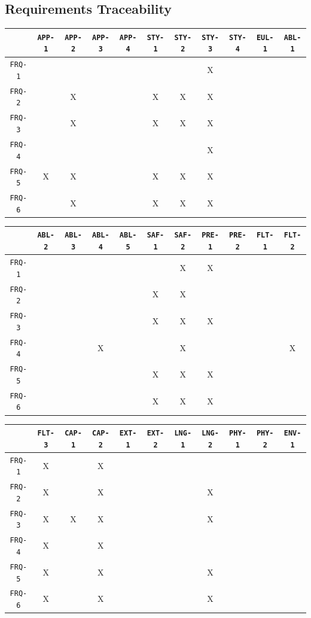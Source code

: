 \documentclass[12pt]{article}
\begin{document}
\begin{enumerate}
\section{Requirements Traceability}


\centering
\begin{tabular}{|c|c|c|c|c|c|c|c|c|c|c|}
\hline
	& \texttt{APP-1} & \texttt{APP-2} & \texttt{APP-3} & \texttt{APP-4} & \texttt{STY-1} & \texttt{STY-2} & \texttt{STY-3} & \texttt{STY-4} & \texttt{EUL-1} & \texttt{ABL-1} \\
\hline
\texttt{FRQ-1} &  &  &  &  &  &  & X &  &  &  \\ \hline
\texttt{FRQ-2} &  & X &  &  & X & X & X &  &  &  \\ \hline
\texttt{FRQ-3} &  & X &  &  & X & X & X &  &  &  \\ \hline
\texttt{FRQ-4} &  &  &  &  &  &  & X &  &  &  \\ \hline
\texttt{FRQ-5} & X & X &  &  & X & X & X &  &  &  \\ \hline
\texttt{FRQ-6} &  & X &  &  & X & X & X &  &  &  \\ \hline
\end{tabular}

\begin{tabular}{|c|c|c|c|c|c|c|c|c|c|c|}
\hline
	& \texttt{ABL-2} & \texttt{ABL-3} & \texttt{ABL-4} & \texttt{ABL-5} & \texttt{SAF-1} & \texttt{SAF-2} & \texttt{PRE-1} & \texttt{PRE-2} & \texttt{FLT-1} & \texttt{FLT-2} \\
\hline
\texttt{FRQ-1} &  &  &  &  &  & X & X &  &  &  \\ \hline
\texttt{FRQ-2} &  &  &  &  & X & X &  &  &  &  \\ \hline
\texttt{FRQ-3} &  &  &  &  & X & X & X &  &  &  \\ \hline
\texttt{FRQ-4} &  &  & X &  &  & X &  &  &  & X \\ \hline
\texttt{FRQ-5} &  &  &  &  & X & X & X &  &  &  \\ \hline
\texttt{FRQ-6} &  &  &  &  & X & X & X &  &  &  \\ \hline
\end{tabular}

\begin{tabular}{|c|c|c|c|c|c|c|c|c|c|c|}
\hline
	& \texttt{FLT-3} & \texttt{CAP-1} & \texttt{CAP-2} & \texttt{EXT-1} & \texttt{EXT-2} & \texttt{LNG-1} & \texttt{LNG-2} & \texttt{PHY-1} & \texttt{PHY-2} & \texttt{ENV-1} \\
\hline
\texttt{FRQ-1} & X &  & X &  &  &  &  &  &  &  \\ \hline
\texttt{FRQ-2} & X &  & X &  &  &  & X &  &  &  \\ \hline
\texttt{FRQ-3} & X & X & X &  &  &  & X &  &  &  \\ \hline
\texttt{FRQ-4} & X &  & X &  &  &  &  &  &  &  \\ \hline
\texttt{FRQ-5} & X &  & X &  &  &  & X &  &  &  \\ \hline
\texttt{FRQ-6} & X &  & X &  &  &  & X &  &  &  \\ \hline
\end{tabular}


\end{enumerate}
\end{document}
